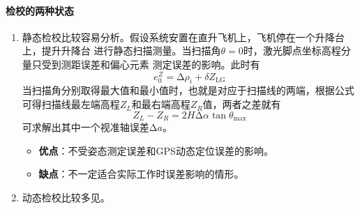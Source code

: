 \paragraph{检校的两种状态}
\begin{enumerate}
	\item {\cukai 静态检校}比较容易分析。假设系统安置在直升飞机上，飞机停在一个升降台上，提升升降台 进行静态扫描测量。当扫描角$ \theta=0 $时，激光脚点坐标高程分量只受到测距误差和偏心元素 测定误差的影响。此时有
		\begin{equation}
		e_0^Z = ∆\rho_i + \delta Z_{\text{LG}}
		\end{equation}
		当扫描角分别取得最大值和最小值时，也就是对应于扫描线的两端，根据公式可得扫描线最左端高程$ Z_L $和最右端高程$ Z_R $值，两者之差就有
		\begin{equation}
		Z_L - Z_R = 2H ∆\alpha \tan \theta_{\max}
		\end{equation}
		可求解出其中一个视准轴误差$ ∆a $。
		\begin{itemize}
			\item \textbf{优点}：不受姿态测定误差和GPS动态定位误差的影响。
			\item \textbf{缺点}：不一定适合实际工作时误差影响的情形。
		\end{itemize}
	\item {\cukai 动态检校}比较多见。
\end{enumerate}

